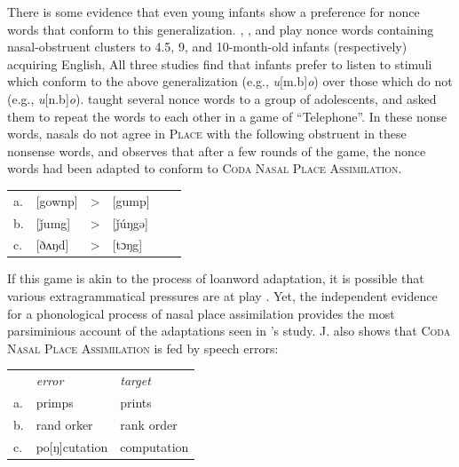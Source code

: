 There is some evidence that even young infants show a preference for nonce words that conform to this generalization. %
\citet{Davidson2004}, \citet{Mattys1999}, and \citet{Jusczyk2002} play nonce words containing nasal-obstruent clusters to 4.5, 9, and 10-month-old infants (respectively) acquiring English, All three studies find that infants prefer to listen to stimuli which conform to the above generalization (e.g., \emph{u}[m.b]\emph{o}) over those which do not (e.g., \emph{u}[n.b]\emph{o}). \citet{Wright1975} taught several nonce words to a group of adolescents, and asked them to repeat the words to each other in a game of ``Telephone''. In these nonse words, nasals do not agree in \textsc{Place} with the following obstruent in these nonsense words, and \citeauthor{Wright1975} observes that after a few rounds of the game, the nonce words had been adapted to conform to \textsc{Coda Nasal Place Assimilation}.

\begin{example}
\begin{tabular}{l l l l l l}
a. & [gownp] & > & [gump] \\
b. & [ǰumg]  & > & [ǰúŋgə] \\
c. & [ðʌŋd]  & > & [tɔŋg] \\
\end{tabular}
\end{example}

\noindent If this game is akin to the process of loanword adaptation, it is possible that various extragrammatical pressures are at play \citep[e.g.,][]{Halle1998b,Dupoux1999,Ussishkin2003,Peperkamp2008}. Yet, the independent evidence for a phonological process of nasal place assimilation provides the most parsiminious account of the adaptations seen in \citeauthor{Wright1975}'s study. J. \citet{Myers1993} also shows that \textsc{Coda Nasal Place Assimilation} is fed by speech errors:

\begin{example}
\begin{tabular}{l l l}
   & \emph{error}  & \emph{target} \\
a. & primps        & prints        \\
b. & rand orker    & rank order    \\
c. & po[ŋ]cutation & computation   \\
\end{tabular} 
\end{example}


